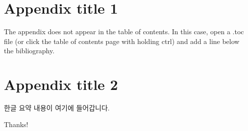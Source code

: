 \documentclass[twoside,ms]{snuthesis_utf8}
\begin{document}
\begin{bibpage}
	
	
\end{bibpage}


\appendix
\chapter{Appendix title 1}
The appendix does not appear in the table of contents.
In this case, open a .toc file (or click the table of contents page with holding ctrl) and add a line below the bibliography.


\chapter{Appendix title 2}

\begin{abstractalt}
한글 요약 내용이 여기에 들어갑니다.
\end{abstractalt}

\acknowledgement
Thanks!
\end{document}
